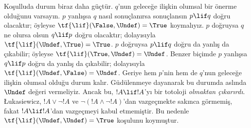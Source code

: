 \documentclass[../../../include/open-logic-section]{subfiles}
\begin{document}
Koşulluda durum biraz daha güçtür. $q$'nun geleceğe ilişkin olumsal bir
önerme olduğunu varsayın. $p$ yanlışsa $q$ nasıl sonuçlanırsa sonuçlansın
$p \lif q$ doğru olacaktır; öyleyse
$\tf{\lif}(\False, \Undef) = \True$ koymalıyız. $p$ doğruysa $q$ ne olursa
olsun $q \lif p$ doğru olacaktır; dolayısıyla
$\tf{\lif}(\Undef, \True) = \True$. $p$ doğruysa $p \lif q$ doğru da yanlış
da çıkabilir; öyleyse $\tf{\lif}(\True, \Undef) = \Undef$. Benzer biçimde
$p$ yanlışsa $q \lif p$ doğru da yanlış da çıkabilir; dolayısıyla
$\tf{\lif}(\Undef, \False) = \Undef$. Geriye hem $p$'nin hem de $q$'nun
geleceğe ilişkin olumsal olduğu durum kalır. Güdülenmeye dayanarak bu durumda
aslında $\Undef$ değeri vermeliyiz. Ancak bu, $!A \lif !A$'yı bir totoloji
\emph{olmaktan çıkarırdı}. \L ukasiewicz, $!A \lor \lnot !A$ ve
$\lnot(!A \land \lnot !A)$'dan vazgeçmekte sakınca görmemiş, fakat
$!A \lif !A$'dan vazgeçmeyi kabul etmemiştir. Bu nedenle
$\tf{\lif}(\Undef, \Undef) = \True$ koşulunu koymuştur.
\end{document}
